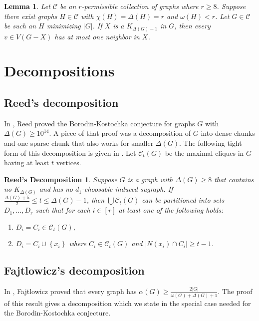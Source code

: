 \documentclass[12pt]{article}
\theoremstyle{plain}
\newtheorem{lem}[thm]{Lemma}
\newtheorem*{ReedDecomp}{Reed's Decomposition}
\theoremstyle{definition}
\theoremstyle{remark}
\newcommand{\fancy}[1]{\mathcal{#1}}
\newcommand{\C}[1]{\fancy{C}_{#1}}
\newcommand{\CC}{\fancy{C}}
\newcommand{\set}[1]{\left\{ #1 \right\}}
\newcommand{\card}[1]{\left|#1\right|}
\newcommand{\irange}[1]{\left[#1\right]}
\def\C{\fancy{C}}
\begin{document}
\begin{lem}\label{EdgesIntoDeltaMinusOneCliqueGeneral}
Let $\C$ be an $r$-permissible collection of graphs where $r \ge 8$.  Suppose there exist graphs $H \in \C$ with $\chi(H) = \Delta(H) = r$ and $\omega(H) < r$.  Let
$G \in \C$ be such an $H$ minimizing $\card{G}$.
If $X$ is a $K_{\Delta(G) - 1}$ in $G$, then every $v \in V(G-X)$ has at most one neighbor in $X$.
\end{lem}



\section{Decompositions}
\subsection{Reed's decomposition}
In \cite{reed1999strengthening}, Reed proved the Borodin-Kostochka conjecture for graphs $G$ with $\Delta(G) \ge 10^{14}$.  A piece of that proof was a decomposition of $G$
into dense chunks and one sparse chunk that also works for smaller $\Delta(G)$.  The following tight form of this decomposition is given in \cite{denseneighborhoods}.
Let $\CC_t(G)$ be the maximal cliques in $G$ having at least $t$ vertices.

\begin{ReedDecomp}
Suppose $G$ is a graph with $\Delta(G) \ge 8$ that contains no $K_{\Delta(G)}$ and has no $d_1$-choosable induced sugraph. If
$\frac{\Delta(G) + 5}{2} \le t \le \Delta(G) - 1$, then $\bigcup \CC_t(G)$ can be
partitioned into sets $D_1, \ldots, D_r$ such that for each $i \in \irange{r}$
at least one of the following holds:
\begin{enumerate}
  \item $D_i = C_i \in \CC_t(G)$,
  \item $D_i = C_i \cup \set{x_i}$ where $C_i \in \CC_t(G)$ and $\card{N(x_i) \cap C_i} \geq t-1$.
\end{enumerate}
\end{ReedDecomp}

\subsection{Fajtlowicz's decomposition}
In \cite{fajtlowicz1984independence}, Fajtlowicz proved that every graph has $\alpha(G) \ge \frac{2\card{G}}{\omega(G) + \Delta(G) + 1}$.  The proof of this result
gives a decomposition which we state in the special case needed for the Borodin-Kostochka conjecture.
\end{document}
